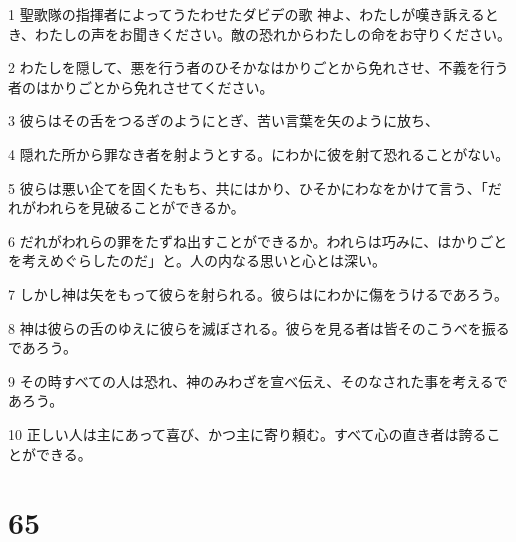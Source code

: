 \par 1 聖歌隊の指揮者によってうたわせたダビデの歌 神よ、わたしが嘆き訴えるとき、わたしの声をお聞きください。敵の恐れからわたしの命をお守りください。
\par 2 わたしを隠して、悪を行う者のひそかなはかりごとから免れさせ、不義を行う者のはかりごとから免れさせてください。
\par 3 彼らはその舌をつるぎのようにとぎ、苦い言葉を矢のように放ち、
\par 4 隠れた所から罪なき者を射ようとする。にわかに彼を射て恐れることがない。
\par 5 彼らは悪い企てを固くたもち、共にはかり、ひそかにわなをかけて言う、「だれがわれらを見破ることができるか。
\par 6 だれがわれらの罪をたずね出すことができるか。われらは巧みに、はかりごとを考えめぐらしたのだ」と。人の内なる思いと心とは深い。
\par 7 しかし神は矢をもって彼らを射られる。彼らはにわかに傷をうけるであろう。
\par 8 神は彼らの舌のゆえに彼らを滅ぼされる。彼らを見る者は皆そのこうべを振るであろう。
\par 9 その時すべての人は恐れ、神のみわざを宣べ伝え、そのなされた事を考えるであろう。
\par 10 正しい人は主にあって喜び、かつ主に寄り頼む。すべて心の直き者は誇ることができる。

\chapter{65}

